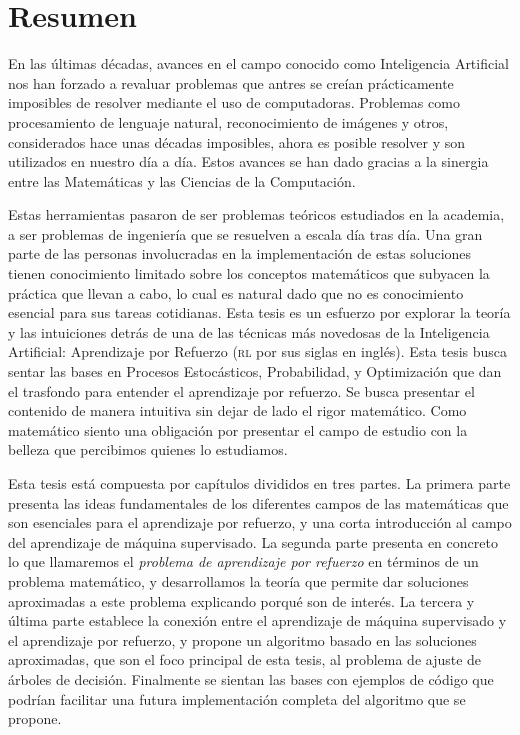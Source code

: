 
\chapter*{Resumen}
En las últimas décadas, avances en el campo conocido como Inteligencia
Artificial nos han forzado a revaluar problemas que antres se creían
prácticamente imposibles de resolver mediante el uso de computadoras. Problemas
como procesamiento de lenguaje natural, reconocimiento de imágenes y otros,
considerados hace unas décadas imposibles, ahora es posible resolver y son
utilizados en nuestro día a día. Estos avances se han dado gracias a la sinergia
entre las Matemáticas y las Ciencias de la Computación.

Estas herramientas pasaron de ser problemas teóricos estudiados en la
a\-ca\-de\-mi\-a, a ser problemas de ingeniería que se resuelven a escala día
tras día. Una gran parte de las personas involucradas en la implementación de
estas soluciones tienen conocimiento limitado sobre los conceptos matemáticos
que subyacen la práctica que llevan a cabo, lo cual es natural dado que no es
conocimiento esencial para sus tareas cotidianas. Esta tesis es un esfuerzo por
explorar la teoría y las intuiciones detrás de una de las técnicas más novedosas
de la Inteligencia Artificial: Aprendizaje por Refuerzo (\textsc{rl} por sus
siglas en inglés). Esta tesis busca sentar las bases en Procesos Estocásticos,
Probabilidad, y Optimización que dan el trasfondo para entender el aprendizaje
por refuerzo. Se busca presentar el contenido de manera intuitiva sin dejar de
lado el rigor matemático. Como matemático siento una obligación por presentar el
campo de estudio con la belleza que percibimos quienes lo estudiamos.

Esta tesis está compuesta por capítulos divididos en tres partes. La primera
parte presenta las ideas fundamentales de los diferentes campos de las
matemáticas que son esenciales para el aprendizaje por refuerzo, y una corta
introducción al campo del aprendizaje de máquina supervisado. La segunda parte
presenta en concreto lo que llamaremos el \emph{problema de aprendizaje por
refuerzo} en términos de un problema matemático, y desarrollamos la teoría que
permite dar soluciones aproximadas a este problema explicando porqué son de
interés. La tercera y última parte establece la conexión entre el aprendizaje de
máquina supervisado y el aprendizaje por refuerzo, y propone un algoritmo basado
en las soluciones aproximadas, que son el foco principal de esta tesis, al
problema de ajuste de árboles de decisión. Finalmente se sientan las bases con
ejemplos de código que podrían facilitar una futura implementación completa del
algoritmo que se propone.

